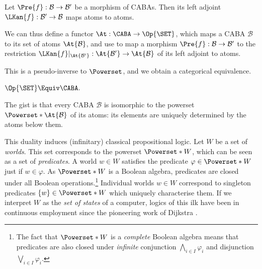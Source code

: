 
\begin{lemma}
  \label{lemma:left-adj-atoms}
  Let $\Pre{f} : \mathcal{B} \to \mathcal{B}'$ be a morphism of CABAs. Then its
  left adjoint $\LKan{f} : \mathcal{B}' \to \mathcal{B}$ maps atoms to atoms.
\end{lemma}

We can thus define a functor $\At : \CABA \to \Op{\SET}$, which maps a CABA
$\mathcal{B}$ to its set of atoms $\At{\mathcal{B}}$, and use
 to map a morphism
$\Pre{f} : \mathcal{B} \to \mathcal{B}'$ to the restriction
$\LKan{f}|_{\At{\mathcal{B}'}} : \At{\mathcal{B}'} \to \At{\mathcal{B}}$ of its
left adjoint to atoms.

This is a pseudo-inverse to $\Powerset$, and we obtain a categorical
equivalence.

\begin{theorem}
  $\Op{\SET} \Equiv \CABA.$
\end{theorem}

The gist is that every CABA $\mathcal{B}$ is isomorphic to the powerset
$\Powerset*{\At{\mathcal{B}}}$ of its atoms: its elements are uniquely
determined by the atoms below them.

This duality induces (infinitary) classical propositional logic. Let $W$ be a
set of \emph{worlds}. This set corresponds to the powerset $\Powerset*{W}$,
which can be seen as a set of \emph{predicates}. A world $w \in W$ satisfies the
predicate $\varphi \in \Powerset*{W}$ just if $w \in \varphi$. As
$\Powerset*{W}$ is a Boolean algebra, predicates are closed under all Boolean
operations.\footnote{The fact that $\Powerset*{W}$ is a \emph{complete} Boolean
  algebra means that predicates are also closed under \emph{infinite}
conjunction $\bigwedge_{i \in I} \varphi_i$ and disjunction $\bigvee_{i \in I}
\varphi_i$.} Individual worlds $w \in W$ correspond to singleton predicates $\{
w \} \in \Powerset*{W}$ which uniquely characterise them. If we interpret $W$ as
the \emph{set of states} of a computer, logics of this ilk have been in
continuous employment since the pioneering work of Dijkstra
\cite{dijkstra_1976}.


